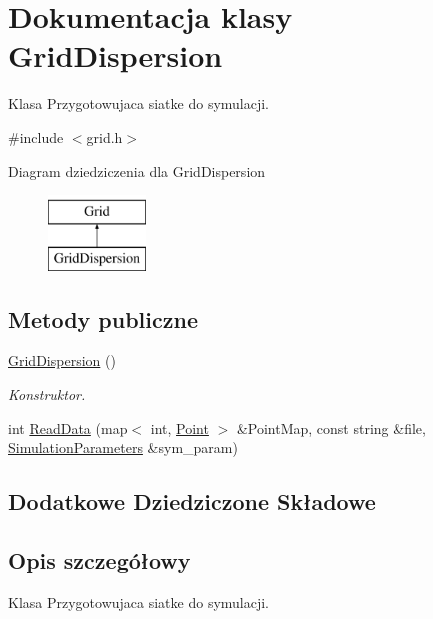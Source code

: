 \hypertarget{class_grid_dispersion}{}\section{Dokumentacja klasy Grid\+Dispersion}
\label{class_grid_dispersion}


Klasa Przygotowujaca siatke do symulacji.  




{\ttfamily \#include $<$grid.\+h$>$}

Diagram dziedziczenia dla Grid\+Dispersion\begin{figure}[H]
\begin{center}
\leavevmode
\includegraphics[height=2.000000cm]{class_grid_dispersion}
\end{center}
\end{figure}
\subsection*{Metody publiczne}
\begin{DoxyCompactItemize}
\item 
\hyperlink{class_grid_dispersion_aa91ae00919a4f12049f9415e3b584b31}{Grid\+Dispersion} ()
\begin{DoxyCompactList}\small\item\em Konstruktor. \end{DoxyCompactList}\item 
int \hyperlink{class_grid_dispersion_afbc03fca9459c90c19959c24df944766}{Read\+Data} (map$<$ int, \hyperlink{class_point}{Point} $>$ \&Point\+Map, const string \&file, \hyperlink{class_simulation_parameters}{Simulation\+Parameters} \&sym\+\_\+param)
\end{DoxyCompactItemize}
\subsection*{Dodatkowe Dziedziczone Składowe}


\subsection{Opis szczegółowy}
Klasa Przygotowujaca siatke do symulacji. 

